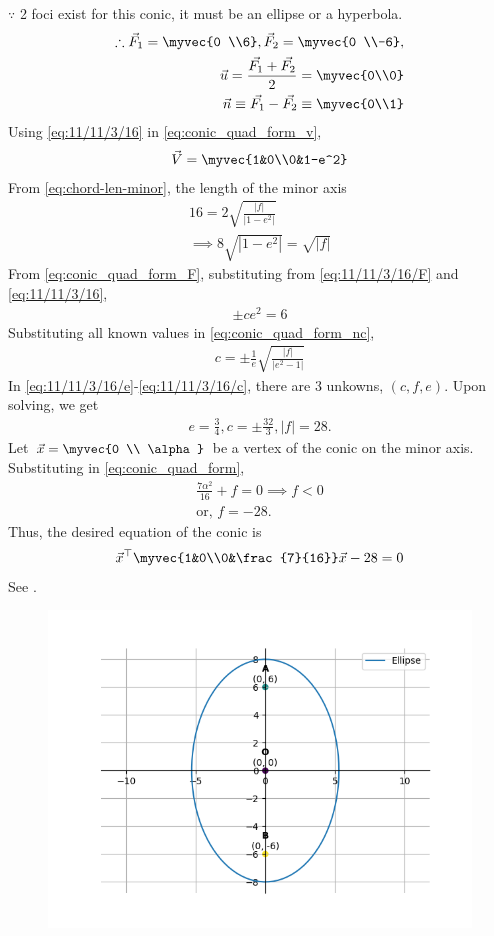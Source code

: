 $\because$ 2 foci exist for this conic, it must be an ellipse or a hyperbola.
\begin{align}
	\therefore 
	\label{eq:11/11/3/16/F}
	\vec{F}_1 =\myvec{0 \\6}, \vec{F}_2 = \myvec{0 \\-6}, 
	\\
\vec{u} =\frac{\vec{F_1}+\vec{F_2}}{2}=\myvec{0\\0}
\\
\vec{n}\equiv\vec{F_1}-\vec{F_2}\equiv\myvec{0\\1}
	\label{eq:11/11/3/16}
\end{align}
Using 
	\eqref{eq:11/11/3/16}
	in
  \eqref{eq:conic_quad_form_v},
\begin{align}
 \vec{V} = \myvec{1&0\\0&1-e^2}
\end{align}
From \eqref{eq:chord-len-minor}, the length of the minor axis
\begin{align}
 16 = 2\sqrt{\frac{|f|}{|1-e^2|}}
 \\
	\implies
8\sqrt{|1-e^2|}=\sqrt{|f|}
	\label{eq:11/11/3/16/e}
\end{align}
  From \eqref{eq:conic_quad_form_F}, substituting from 
	\eqref{eq:11/11/3/16/F}
	and 
	\eqref{eq:11/11/3/16},
\begin{align}
	\label{eq:11/11/3/16/c1}
\pm ce^2=6
\end{align}
Substituting all known values in
\eqref{eq:conic_quad_form_nc}, 
\begin{align}
c=\pm\frac{1}{e}\sqrt{\frac{|f|}{|e^2-1|}}
	\label{eq:11/11/3/16/c}
\end{align}
	In \eqref{eq:11/11/3/16/e}-\eqref{eq:11/11/3/16/c}, there are 3 unkowns, $(c, f, e)$.  
Upon solving, we get 
\begin{align}
e=\frac{3}{4}, c=\pm\frac{32}{3}, |f|=28.
\end{align}
Let
$
 \vec{x}= \myvec{0 \\ \alpha}
 $
be a vertex of the conic on the minor axis.  Substituting in
    \eqref{eq:conic_quad_form},
\begin{align}
\frac{7\alpha^2}{16}+f=0 \implies f < 0
\\
	\text{or, }
f = -28.
\end{align}
Thus, the desired 
equation of the conic is
\begin{align}
\vec{x}^\top\myvec{1&0\\0&\frac{7}{16}}\vec{x}-28 = 0
\end{align}
See
	.
\begin{figure}[H]
	\centering
	\includegraphics[width=0.75\columnwidth]{chapters/11/11/3/16/figs/fig.png}
	\caption{}
	\label{fig:11/11/3/16}
\end{figure}


